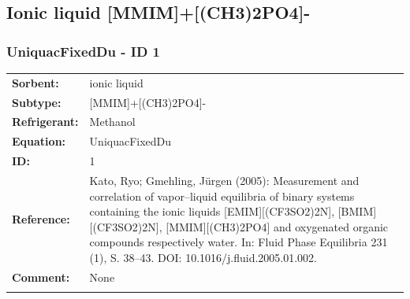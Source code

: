 \subsection{Ionic liquid [MMIM]+[(CH3)2PO4]-}
%
\subsubsection{UniquacFixedDu - ID 1}
%
\begin{tabular}[l]{|lp{11.5cm}|}
\hline
\addlinespace

\textbf{Sorbent:} & ionic liquid \\
\textbf{Subtype:} & [MMIM]+[(CH3)2PO4]- \\
\textbf{Refrigerant:} & Methanol \\
\textbf{Equation:} & UniquacFixedDu \\
\textbf{ID:} & 1 \\
\textbf{Reference:} & Kato, Ryo; Gmehling, Jürgen (2005): Measurement and correlation of vapor–liquid equilibria of binary systems containing the ionic liquids [EMIM][(CF3SO2)2N], [BMIM][(CF3SO2)2N], [MMIM][(CH3)2PO4] and oxygenated organic compounds respectively water. In: Fluid Phase Equilibria 231 (1), S. 38–43. DOI: 10.1016/j.fluid.2005.01.002. \\
\textbf{Comment:} & None \\

\addlinespace
\hline
\end{tabular}
\newline

